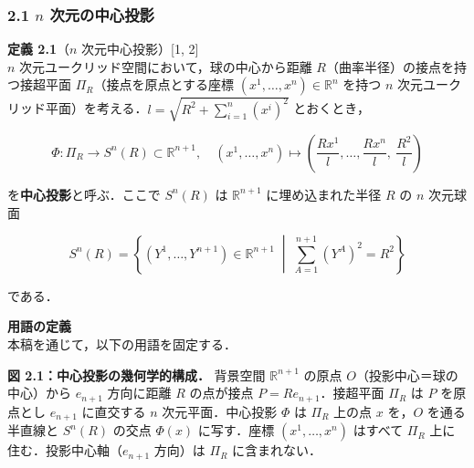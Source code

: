 \documentclass[a4paper,11pt]{ltjsarticle}
\theoremstyle{definition}
\begin{document}
\subsubsection{\texorpdfstring{2.1 \(n\) 次元の中心投影}{2.1 n 次元の中心投影}}\label{n-ux6b21ux5143ux306eux4e2dux5fc3ux6295ux5f71}

\textbf{定義 2.1}（\(n\) 次元中心投影）{[}1, 2{]}\\
\(n\) 次元ユークリッド空間において，球の中心から距離 \(R\)（曲率半径）の接点を持つ接超平面 \(\Pi_R\)（接点を原点とする座標 \((x^1, \ldots, x^n) \in \mathbb{R}^n\) を持つ \(n\) 次元ユークリッド平面）を考える．\(l = \sqrt{R^2 + \sum_{i=1}^n (x^i)^2}\) とおくとき，

\[\Phi: \Pi_R \to S^n(R) \subset \mathbb{R}^{n+1}, \quad (x^1, \ldots, x^n) \mapsto \left(\frac{R x^1}{l}, \ldots, \frac{R x^n}{l},\ \frac{R^2}{l}\right) \tag{2.1}\]

を\textbf{中心投影}と呼ぶ．ここで \(S^n(R)\) は \(\mathbb{R}^{n+1}\) に埋め込まれた半径 \(R\) の \(n\) 次元球面

\[S^n(R) = \left\{(Y^1, \ldots, Y^{n+1}) \in \mathbb{R}^{n+1} \;\middle|\; \sum_{A=1}^{n+1} (Y^A)^2 = R^2 \right\}\]

である．

\textbf{用語の定義}\\
本稿を通じて，以下の用語を固定する．

\textbf{図 2.1：中心投影の幾何学的構成．} 背景空間 \(\mathbb{R}^{n+1}\) の原点 \(O\)（投影中心＝球の中心）から \(e_{n+1}\) 方向に距離 \(R\) の点が接点 \(P = Re_{n+1}\)．接超平面 \(\Pi_R\) は \(P\) を原点とし \(e_{n+1}\) に直交する \(n\) 次元平面．中心投影 \(\Phi\) は \(\Pi_R\) 上の点 \(x\) を，\(O\) を通る半直線と \(S^n(R)\) の交点 \(\Phi(x)\) に写す．座標 \((x^1, \ldots, x^n)\) はすべて \(\Pi_R\) 上に住む．投影中心軸（\(e_{n+1}\) 方向）は \(\Pi_R\) に含まれない．
\end{document}
